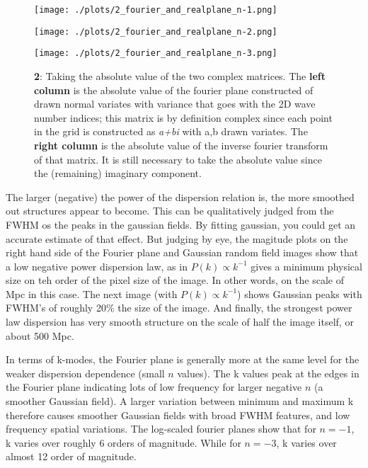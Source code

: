 \begin{figure}[h!]
  \centering
  \texttt{[image: ./plots/2\_fourier\_and\_realplane\_n-1.png]}
  \label{fig:abs}
\end{figure}

\begin{figure}[h!]
  \centering
  \texttt{[image: ./plots/2\_fourier\_and\_realplane\_n-2.png]}
  \label{fig:abs}
\end{figure}

\begin{figure}[h!]
  \centering
  \texttt{[image: ./plots/2\_fourier\_and\_realplane\_n-3.png]}
  \caption{\textbf{2}: Taking the absolute value of the two complex matrices. The \textbf{left column} is the absolute value of the fourier plane constructed of drawn normal variates with variance that goes with the 2D wave number indices; this matrix is by definition complex since each point in the grid is constructed as \textit{a+bi} with a,b drawn variates. The \textbf{right column} is the absolute value of the inverse fourier transform of that matrix. It is still necessary to take the absolute value since the (remaining) imaginary component.}
  \label{fig:abs}
\end{figure}


The larger (negative) the power of the dispersion relation is, the more smoothed out structures appear to become. This can be qualitatively judged from the FWHM os the peaks in the gaussian fields. By fitting gaussian, you could get an accurate estimate of that effect. But judging by eye, the magitude plots on the right hand side of the Fourier plane and Gaussian random field images show that a low negative power dispersion law, as in $P(k) \propto k^{-1}$ gives a minimum physical size on teh order of the pixel size of the image. In other words, on the scale of Mpc in this case. The next image (with $P(k) \propto k^{-1}$) shows Gaussian peaks with FWHM's of roughly 20\% the size of the image. And finally, the strongest power law dispersion has very smooth structure on the scale of half the image itself, or about 500 Mpc.

In terms of k-modes, the Fourier plane is generally more at the same level for the weaker dispersion dependence (small $n$ values). The k values peak at the edges in the Fourier plane indicating lots of low frequency for larger negative $n$ (a smoother Gaussian field). A larger variation between minimum and maximum k therefore causes smoother Gaussian fields with broad FWHM features, and low frequency spatial variations. The log-scaled fourier planes show that for $n=-1$, k varies over roughly 6 orders of magnitude. While for $n=-3$, k varies over almost 12 order of magnitude.

